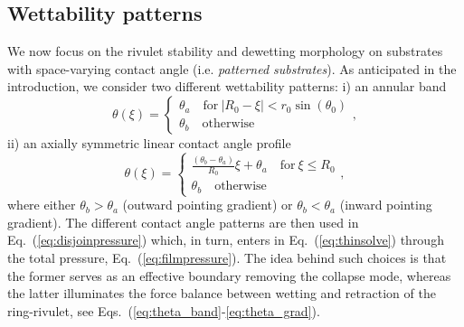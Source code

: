 \documentclass[twoside,twocolumn,9pt]{article}
\begin{document}
\subsection{Wettability patterns}\label{subsec:wettability}
We now focus on the rivulet stability and dewetting morphology on substrates with space-varying contact angle (i.e. {\it patterned substrates}).
As anticipated in the introduction, we consider two different wettability patterns: i) an annular band 
\begin{equation}\label{eq:theta_band}
    \theta(\xi) =\begin{cases}
        \theta_a \quad \text{for}~|R_0-\xi| < r_0\sin(\theta_0) \\
        \theta_b\quad \text{otherwise}
    \end{cases},
\end{equation}
ii) an axially symmetric linear contact angle profile
\begin{equation}\label{eq:theta_grad}
    \theta(\xi) =\begin{cases}
        \frac{(\theta_{b}-\theta_{a})}{R_0} \xi + \theta_{a} \quad \text{for}~\xi \leq R_0 \\
        \theta_b \quad \text{otherwise}
    \end{cases},
\end{equation}
where either $\theta_{b} > \theta_{a}$ (outward pointing gradient) or $\theta_b < \theta_a$ (inward pointing gradient).
The different contact angle patterns are then used in Eq.~(\ref{eq:disjoinpressure}) which, in turn, enters in Eq.~(\ref{eq:thinsolve}) through the total pressure, Eq.~(\ref{eq:filmpressure}).
The idea behind such choices is that the former serves as an effective boundary removing the collapse mode, whereas the latter illuminates the force balance between wetting and retraction of the ring-rivulet, see Eqs.~(\ref{eq:theta_band}-\ref{eq:theta_grad}).
\end{document}
